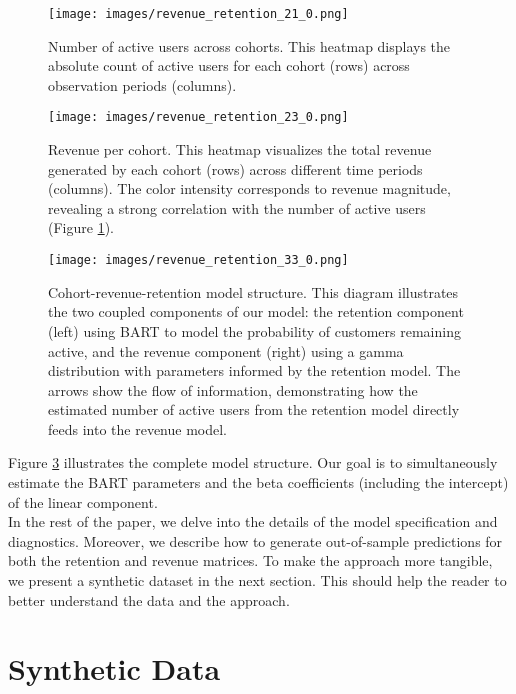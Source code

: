 \documentclass[11pt]{amsart}
\theoremstyle{definition}
\begin{document}
\begin{figure}
    \centering
    \texttt{[image: images/revenue\_retention\_21\_0.png]}
    \caption{Number of active users across cohorts. This heatmap displays the absolute count of active users for each
        cohort (rows) across observation periods (columns).}
    \label{fig:active_users}
\end{figure}

\begin{figure}
    \centering
    \texttt{[image: images/revenue\_retention\_23\_0.png]}
    \caption{Revenue per cohort. This heatmap visualizes the total revenue generated by each cohort (rows) across different
        time periods (columns). The color intensity corresponds to revenue magnitude, revealing a strong correlation
        with the number of active users (Figure \ref{fig:active_users}).}
    \label{fig:revenue}
\end{figure}

\begin{figure}
    \centering
    \texttt{[image: images/revenue\_retention\_33\_0.png]}
    \caption{Cohort-revenue-retention model structure. This diagram illustrates the two coupled components of our model:
        the retention component (left) using BART to model the probability of customers remaining active, and the
        revenue component (right) using a gamma distribution with parameters informed by the retention model. The arrows
        show the flow of information, demonstrating how the estimated number of active users from the retention model
        directly feeds into the revenue model.}
    \label{fig:revenue_retention_model}
\end{figure}

Figure \ref{fig:revenue_retention_model} illustrates the complete model structure. Our goal is to simultaneously estimate
the BART parameters and the beta coefficients (including the intercept) of the linear component.  \\

In the rest of the paper, we delve into the details of the model specification and diagnostics. Moreover, we describe
how to generate out-of-sample predictions for both the retention and revenue matrices. To make the approach more tangible,
we present a synthetic dataset in the next section. This should help the reader to better understand the data and the approach.

\section{Synthetic Data}
\end{document}

